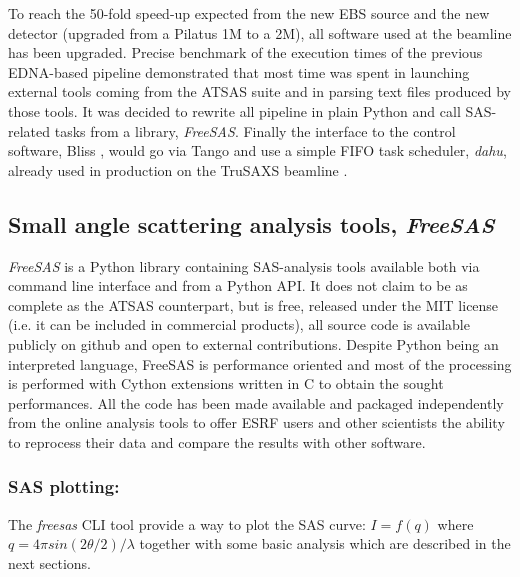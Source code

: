 \documentclass[preprint]{iucr}              %
\begin{document}
To reach the 50-fold speed-up expected from the new EBS source and the new detector (upgraded from a Pilatus 1M to a 2M), all software used at the beamline has been upgraded.
Precise benchmark of the execution times of the previous EDNA-based pipeline demonstrated that 
most time was spent in launching external tools coming from the ATSAS suite and in parsing text files produced by those tools.
It was decided to rewrite all pipeline in plain Python \cite{python} and call SAS-related tasks from a library, \textit{FreeSAS}. 
Finally the interface to the control software, Bliss \cite{bliss}, would go via Tango \cite{tango} and use a simple FIFO task scheduler,  \textit{dahu}, already used in production on the TruSAXS beamline \cite{id02_2022}.   

\subsection{Small angle scattering analysis tools, \textit{FreeSAS}}

\textit{FreeSAS} is a Python library containing SAS-analysis tools available both via command line interface and from a Python API. 
It does not claim to be as complete as the ATSAS counterpart,
but is free, released under the MIT license (i.e. it can be included in commercial products), all source code is available publicly on github \cite{freesas} and
open to external contributions.
Despite Python being an interpreted language, FreeSAS is performance oriented and most of the processing is performed with Cython \cite{cython} extensions written in C to obtain the sought performances. 
All the code has been made available and packaged independently from the online analysis tools to offer ESRF users and other scientists the ability to reprocess their data and compare the results with other software.

\subsubsection{SAS plotting:} The \textit{freesas} CLI tool provide a way to plot the SAS curve: $I=f(q)$ where $q = 4\pi sin(2\theta/2)/\lambda$ together with some basic analysis which are described in the next sections.
\end{document}
